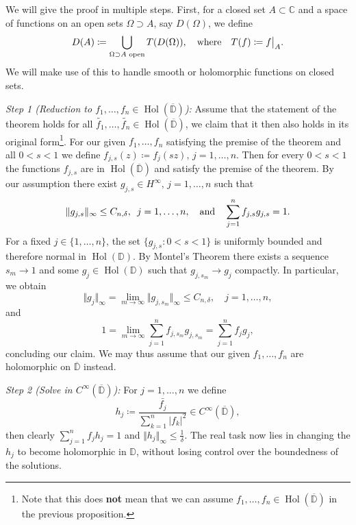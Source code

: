 \documentclass[letterpaper, 11pt]{article}
\newcommand{\C}{\mathbb{C}}
\newcommand{\D}{\mathbb{D}}
\newcommand{\1}{\mathds{1}}
\newcommand{\cl}[1]{\overline{#1}}
\newcommand{\restr}[2]{{%
  \left.\kern-\nulldelimiterspace %
  #1 %
  \littletaller %
  \right|_{#2} %
  }}
\newcommand{\littletaller}{\mathchoice{\vphantom{\big|}}{}{}{}}
\DeclareMathOperator*{\Hol}{Hol}
\theoremstyle{definition}
\newenvironment{innerproof}
 {\renewcommand{\qedsymbol}{}\proof}
 {\endproof}
\begin{document}
\begin{innerproof}
  We will give the proof in multiple steps. First, for a closed set $A \subset \C$ and a space of functions on an open sets $\Omega \supset A$, say $D(\Omega)$, we define
  \begin{equation*}
    D(A) \coloneqq \bigcup_{\Omega \supset A \textrm{ open}} T(D(\Omega)), \quad \textrm{where} \quad T(f) \coloneqq \restr{f}{A}.
  \end{equation*}
  We will make use of this to handle smooth or holomorphic functions on closed sets.

  \textit{Step 1 (Reduction to $f_1, \dots, f_n \in \Hol(\cl{\D})$):} Assume that the statement of the theorem holds for all $\widetilde{f_1}, \dots, \widetilde{f_n} \in \Hol(\cl{\D})$, we claim that it then also holds in its original form\footnote{Note that this does \textbf{not} mean that we can assume $f_1, \dots, f_n \in \Hol(\cl{\D})$ in the previous proposition.}. For our given $f_1, \dots, f_n$ satisfying the premise of the theorem and all $0 < s < 1$ we define $ f_{j,s}(z) \coloneqq f_{j}(sz), \, j=1,\dots,n $. Then for every $0 < s < 1$ the functions $f_{j,s}$ are in $\Hol(\cl{\D})$ and satisfy the premise of the theorem. By our assumption there exist $g_{j,s} \in H^\infty, \, j=1,\dots,n$ such that
  $$ \Vert g_{j,s} \Vert_\infty \leq C_{n,\delta}, \hspace{0.5em} j = 1, \dots, n, \quad \textrm{and} \quad \sum_{j=1}^n f_{j,s} g_{j,s} = 1. $$
  For a fixed $j \in \{ 1, \dots, n \}$, the set $\{ g_{j,s} : 0 < s < 1 \}$ is uniformly bounded and therefore normal in $\Hol(\D)$. By Montel's Theorem there exists a sequence $s_m \to 1$ and some $g_j \in \Hol(\D)$ such that $g_{j,s_m} \to g_{j}$ compactly. In particular, we obtain
  $$ \Vert g_j \Vert_\infty = \lim_{m \to \infty} \Vert g_{j,s_m} \Vert_\infty \leq C_{n,\delta}, \quad j=1,\dots,n, $$
  and
  $$ 1 = \lim_{m \to \infty} \sum_{j=1}^n f_{j,s_m} g_{j,s_m} = \sum_{j=1}^n f_j g_j, $$
  concluding our claim. We may thus assume that our given $f_1, \dots, f_n$ are holomorphic on $\cl{\D}$ instead.

  \textit{Step 2 (Solve in $C^\infty(\cl{\D})$):} For $j=1,\dots,n$ we define
  $$ h_j \coloneqq \frac{\bar{f_j}}{\sum_{k=1}^n \vert f_k \vert^2} \in C^\infty(\cl{\D}), $$
  then clearly $ \sum_{j=1}^n f_j h_j = 1$ and $\Vert h_j \Vert_\infty \leq \frac{1}{\delta}$. The real task now lies in changing the $h_j$ to become holomorphic in $\D$, without losing control over the boundedness of the solutions.
\end{innerproof}
\end{document}
